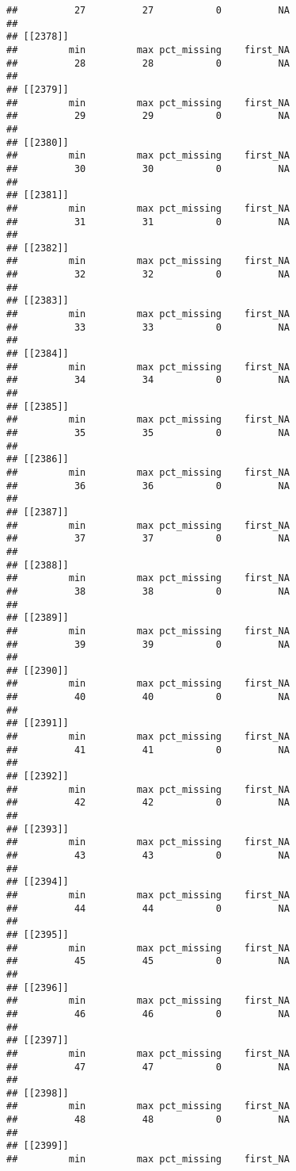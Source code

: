 \documentclass[
]{article}
\begin{document}
\begin{verbatim}
##          27          27           0          NA 
## 
## [[2378]]
##         min         max pct_missing    first_NA 
##          28          28           0          NA 
## 
## [[2379]]
##         min         max pct_missing    first_NA 
##          29          29           0          NA 
## 
## [[2380]]
##         min         max pct_missing    first_NA 
##          30          30           0          NA 
## 
## [[2381]]
##         min         max pct_missing    first_NA 
##          31          31           0          NA 
## 
## [[2382]]
##         min         max pct_missing    first_NA 
##          32          32           0          NA 
## 
## [[2383]]
##         min         max pct_missing    first_NA 
##          33          33           0          NA 
## 
## [[2384]]
##         min         max pct_missing    first_NA 
##          34          34           0          NA 
## 
## [[2385]]
##         min         max pct_missing    first_NA 
##          35          35           0          NA 
## 
## [[2386]]
##         min         max pct_missing    first_NA 
##          36          36           0          NA 
## 
## [[2387]]
##         min         max pct_missing    first_NA 
##          37          37           0          NA 
## 
## [[2388]]
##         min         max pct_missing    first_NA 
##          38          38           0          NA 
## 
## [[2389]]
##         min         max pct_missing    first_NA 
##          39          39           0          NA 
## 
## [[2390]]
##         min         max pct_missing    first_NA 
##          40          40           0          NA 
## 
## [[2391]]
##         min         max pct_missing    first_NA 
##          41          41           0          NA 
## 
## [[2392]]
##         min         max pct_missing    first_NA 
##          42          42           0          NA 
## 
## [[2393]]
##         min         max pct_missing    first_NA 
##          43          43           0          NA 
## 
## [[2394]]
##         min         max pct_missing    first_NA 
##          44          44           0          NA 
## 
## [[2395]]
##         min         max pct_missing    first_NA 
##          45          45           0          NA 
## 
## [[2396]]
##         min         max pct_missing    first_NA 
##          46          46           0          NA 
## 
## [[2397]]
##         min         max pct_missing    first_NA 
##          47          47           0          NA 
## 
## [[2398]]
##         min         max pct_missing    first_NA 
##          48          48           0          NA 
## 
## [[2399]]
##         min         max pct_missing    first_NA 

\end{verbatim}
\end{document}
